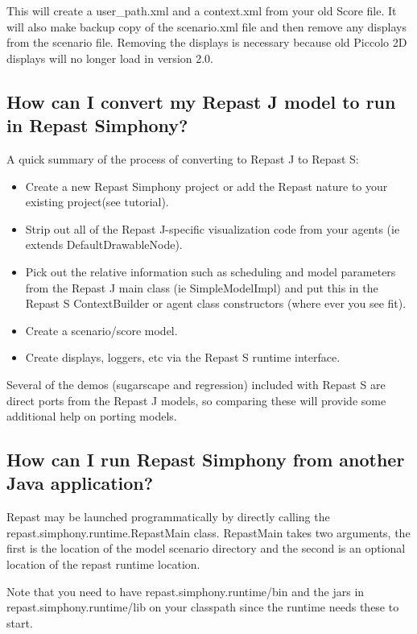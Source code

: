 \documentclass[11pt]{article}
\begin{document}
This will create a user\_path.xml and a context.xml from your old Score file. It will also make backup copy of the scenario.xml file and then remove any displays from the scenario file. Removing the displays is necessary because old Piccolo 2D displays will no longer load in version 2.0.

\subsection{How can I convert my Repast J model to run in Repast Simphony?}
\label{prs:convert_j}

A quick summary of the process of converting to Repast J to Repast S:
\begin{itemize}
\item Create a new Repast Simphony project or add the Repast nature to your existing project(see tutorial).
\item Strip out all of the Repast J-specific visualization code from your agents (ie extends DefaultDrawableNode).
\item Pick out the relative information such as scheduling and model parameters from the Repast J main class (ie SimpleModelImpl) and put this in the Repast S ContextBuilder or agent class constructors (where ever you see fit).
\item Create a scenario/score model.
\item Create displays, loggers, etc via the Repast S runtime interface.
\end{itemize}

Several of the demos (sugarscape and regression) included with Repast S are direct ports from the Repast J models, so comparing these will provide some additional help on porting models.

\subsection{How can I run Repast Simphony from another Java application?}
\label{prs:rs_in_java}

Repast may be launched programmatically by directly calling the repast.simphony.runtime.RepastMain class. RepastMain takes two arguments, the first is the location of the model scenario directory and the second is an optional location of the repast runtime location.

Note that you need to have repast.simphony.runtime/bin and the jars in repast.simphony.runtime/lib on your classpath since the runtime needs these to start.
\end{document}
